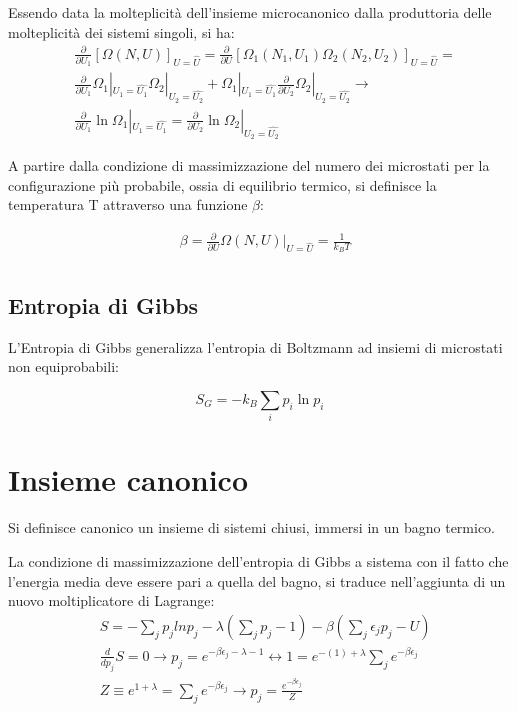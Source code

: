 \documentclass{article}
\begin{document}
Essendo data la molteplicità dell'insieme microcanonico dalla produttoria delle molteplicità dei sistemi singoli, si ha:
\begin{equation}
    \begin{aligned}
         & \frac{\partial}{\partial U_1}[\Omega(N, U)]_{U=\hat{U}} = \frac{\partial}{\partial U}[\Omega_1(N_1, U_1)\Omega_2(N_2, U_2)]_{U=\hat{U}} =                                     \\
         & \frac{\partial}{\partial U_1}\Omega_1|_{U_1=\hat{U_1}}\Omega_2|_{U_2=\hat{U_2}} + \Omega_1|_{U_1=\hat{U_1}}\frac{\partial}{\partial U_2}\Omega_2|_{U_2=\hat{U_2}} \rightarrow \\
         & \frac{\partial}{\partial U_1}\ln{\Omega_1}|_{U_1=\hat{U_1}}=\frac{\partial}{\partial U_2}\ln{\Omega_2}|_{U_2=\hat{U_2}}
    \end{aligned}
\end{equation}

A partire dalla condizione di massimizzazione del numero dei microstati per la configurazione più probabile, ossia di equilibrio termico,
si definisce la temperatura T attraverso una funzione $\beta$:

\begin{equation}
    \begin{aligned}
         & \beta=\frac{\partial}{\partial U}\Omega(N,U)|_{U=\hat{U}} = \frac{1}{k_BT} \\
    \end{aligned}
\end{equation}

\subsection{Entropia di Gibbs}
L'Entropia di Gibbs generalizza l'entropia di Boltzmann ad insiemi di microstati non equiprobabili:

\begin{equation}
    S_G=-k_B\sum_{i}p_i\ln{p_i}
\end{equation}


\section{Insieme canonico}
Si definisce canonico un insieme di sistemi chiusi, immersi in un bagno termico.

La condizione di massimizzazione dell'entropia di Gibbs a sistema con il fatto che l'energia media deve essere pari a quella del bagno, si traduce nell'aggiunta di un nuovo moltiplicatore di Lagrange:
\begin{equation}
    \begin{aligned}
         & S=-\sum_{j}p_jln{p_j}-\lambda\left(\sum_{j}p_j-1\right)-\beta\left(\sum_{j}\epsilon_jp_j-U\right)                                \\
         & \frac{d}{dp_j}S =0 \rightarrow p_j=e^{-\beta\epsilon_j-\lambda-1} \leftrightarrow 1=e^{-(1)+\lambda}\sum_{j}e^{-\beta\epsilon_j} \\
         & Z\equiv e^{1+\lambda}= \sum_{j}e^{-\beta\epsilon_j} \rightarrow p_j=\frac{e^{-\beta\epsilon_j}}{Z}
    \end{aligned}
\end{equation}
\end{document}
